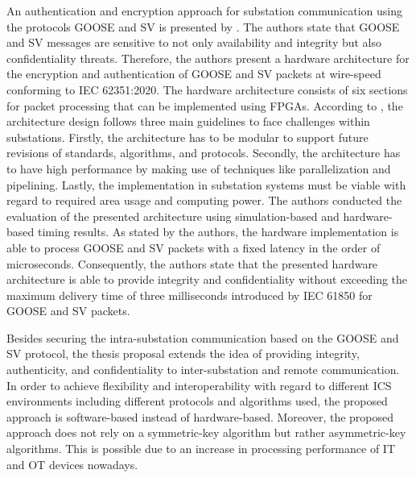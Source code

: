An authentication and encryption approach for substation communication using the protocols GOOSE and SV is presented by \citeauthor{Rodriguez2021} \cite{Rodriguez2021}.
The authors state that GOOSE and SV messages are sensitive to not only availability and integrity but also confidentiality threats.
Therefore, the authors present a hardware architecture for the encryption and authentication of GOOSE and SV packets at wire-speed conforming to IEC 62351:2020.
The hardware architecture consists of six sections for packet processing that can be implemented using FPGAs.
According to \citeauthor{Rodriguez2021}, the architecture design follows three main guidelines to face challenges within substations.
Firstly, the architecture has to be modular to support future revisions of standards, algorithms, and protocols.
Secondly, the architecture has to have high performance by making use of techniques like parallelization and pipelining.
Lastly, the implementation in substation systems must be viable with regard to required area usage and computing power.
The authors conducted the evaluation of the presented architecture using simulation-based and hardware-based timing results.
As stated by the authors, the hardware implementation is able to process GOOSE and SV packets with a fixed latency in the order of microseconds.
Consequently, the authors state that the presented hardware architecture is able to provide integrity and confidentiality without exceeding the maximum delivery time of three milliseconds introduced by IEC 61850 for GOOSE and SV packets.

Besides securing the intra-substation communication based on the GOOSE and SV protocol, the thesis proposal extends the idea of providing integrity, authenticity, and confidentiality to inter-substation and remote communication.
In order to achieve flexibility and interoperability with regard to different ICS environments including different protocols and algorithms used, the proposed approach is software-based instead of hardware-based.
Moreover, the proposed approach does not rely on a symmetric-key algorithm but rather asymmetric-key algorithms.
This is possible due to an increase in processing performance of IT and OT devices nowadays.

